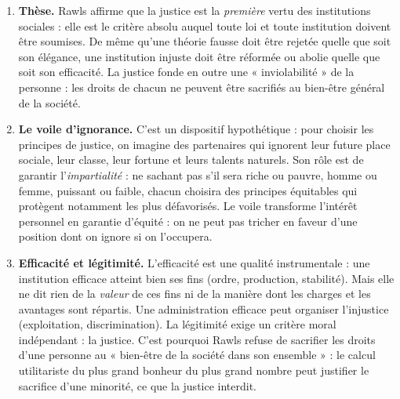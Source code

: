 \documentclass[11pt]{article}
\begin{document}
\begin{corrige}
\begin{enumerate}
\item \textbf{Thèse.} Rawls affirme que la justice est la \emph{première} vertu des institutions sociales : elle est le critère absolu auquel toute loi et toute institution doivent être soumises. De même qu'une théorie fausse doit être rejetée quelle que soit son élégance, une institution injuste doit être réformée ou abolie quelle que soit son efficacité. La justice fonde en outre une « inviolabilité » de la personne : les droits de chacun ne peuvent être sacrifiés au bien-être général de la société.
\item \textbf{Le voile d'ignorance.} C'est un dispositif hypothétique : pour choisir les principes de justice, on imagine des partenaires qui ignorent leur future place sociale, leur classe, leur fortune et leurs talents naturels. Son rôle est de garantir l'\emph{impartialité} : ne sachant pas s'il sera riche ou pauvre, homme ou femme, puissant ou faible, chacun choisira des principes équitables qui protègent notamment les plus défavorisés. Le voile transforme l'intérêt personnel en garantie d'équité : on ne peut pas tricher en faveur d'une position dont on ignore si on l'occupera.
\item \textbf{Efficacité et légitimité.} L'efficacité est une qualité instrumentale : une institution efficace atteint bien ses fins (ordre, production, stabilité). Mais elle ne dit rien de la \emph{valeur} de ces fins ni de la manière dont les charges et les avantages sont répartis. Une administration efficace peut organiser l'injustice (exploitation, discrimination). La légitimité exige un critère moral indépendant : la justice. C'est pourquoi Rawls refuse de sacrifier les droits d'une personne au « bien-être de la société dans son ensemble » : le calcul utilitariste du plus grand bonheur du plus grand nombre peut justifier le sacrifice d'une minorité, ce que la justice interdit.

\end{enumerate}
\end{corrige}
\end{document}

